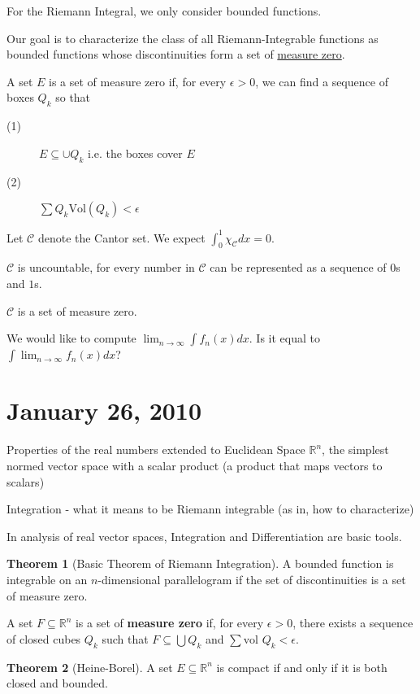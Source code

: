 \documentclass[12pt,leqno]{article}
\numberwithin{equation}{section}
\theoremstyle{definition}
\newtheorem*{Thm}{Theorem}
\begin{document}
For the Riemann Integral, we only consider bounded functions.

Our goal is to characterize the class of all Riemann-Integrable functions as bounded functions whose discontinuities form a set of \underline{measure zero}.

A set $E$ is a set of measure zero if, for every $\epsilon>0$, we can find a sequence of boxes $Q_k$ so that
\begin{description}
 \item [(1)] $E\subseteq\cup Q_k$ i.e. the boxes cover $E$
 \item [(2)] $\sum Q_k\text{Vol}(Q_k)<\epsilon$
\end{description}

Let $\mathcal{C}$ denote the Cantor set. We expect $\int_0^1 \chi_{\mathcal{C}}dx=0$.

$\mathcal{C}$ is uncountable, for every number in $\mathcal{C}$ can be represented as a sequence of $0$s and $1$s.

$\mathcal{C}$ is a set of measure zero.

We would like to compute $\displaystyle\lim_{n\to\infty}\int f_n(x)dx$. Is it equal to $\displaystyle\int\lim_{n\to\infty}f_n(x)dx$?

\section{January 26, 2010}

Properties of the real numbers extended to Euclidean Space $\mathbb{R}^n$, the simplest normed vector space with a scalar product (a product that maps vectors to scalars)

Integration - what it means to be Riemann integrable (as in, how to characterize)

In analysis of real vector spaces, Integration and Differentiation are basic tools.

\begin{Thm}[Basic Theorem of Riemann Integration]
 A bounded function is integrable on an $n$-dimensional parallelogram if the set of discontinuities is a set of measure zero.
\end{Thm}

A set $F\subseteq\mathbb{R}^n$ is a set of \textbf{measure zero} if, for every $\epsilon>0$, there exists a sequence of closed cubes $Q_k$ such that $F\subseteq\bigcup Q_k$ and $\sum\text{vol }Q_k<\epsilon$.

\begin{Thm}[Heine-Borel]
 A set $E\subseteq\mathbb{R}^n$ is compact if and only if it is both closed and bounded.
\end{Thm}
\end{document}

